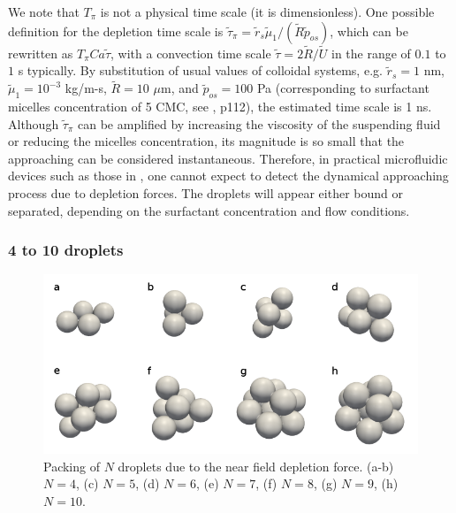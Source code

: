 We note that $T_\pi$ is not a physical time scale (it is dimensionless). One possible definition for the depletion time scale is $\tilde{\tau}_\pi = \tilde{r}_s \tilde{\mu}_1 /(\tilde{R} \tilde{p}_{os})$, which can be rewritten as $T_\pi Ca \tilde{\tau}$, with a convection time scale $\tilde{\tau} =2\tilde{R}/\tilde{U}$ in the range of $0.1$ to $1$ s typically. By substitution of usual values of colloidal systems, e.g. $\tilde{r}_s = 1$ nm, $\tilde{\mu}_1 = 10^{-3}$ kg/m-s, $\tilde{R} = 10$ $\mu$m, and $\tilde{p}_{os} = 100$ Pa (corresponding to surfactant micelles concentration of 5 CMC, see  \cite{shen_thesis}, p112), the estimated time scale is 1 ns. Although $\tilde{\tau}_\pi$ can be amplified by increasing the viscosity of the suspending fluid or reducing the micelles concentration, its magnitude is so small that the approaching can be considered instantaneous. Therefore, in practical microfluidic devices such as those in   \cite{Shen_2016AS}, one cannot expect to detect the dynamical approaching process due to depletion forces. The droplets will appear either bound or separated, depending on the surfactant concentration and flow conditions.

\subsubsection{4 to 10 droplets}

\begin{figure}[t]
 \centering
 \includegraphics[width=0.9\columnwidth]{figs/packings.png}
 \caption{Packing of $N$ droplets due to the near field depletion force. (a-b) $N = 4$, (c) $N = 5$, (d) $N = 6$, (e) $N = 7$, (f) $N = 8$, (g) $N = 9$, (h) $N = 10$.}
 \label{fig: sph pack}
\end{figure}

